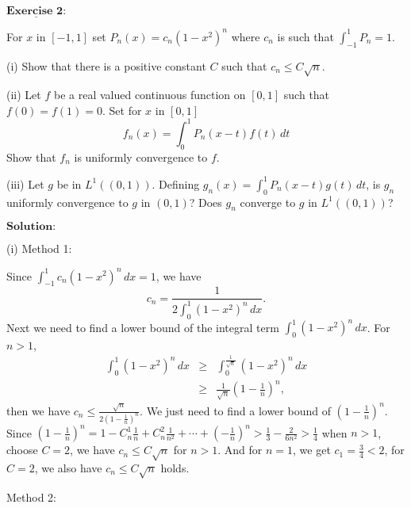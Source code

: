 \documentclass[12pt,a4paper]{ctexart}
\begin{document}
$\underline{\textbf{Exercise 2:}}$

For $x$ in $[-1, 1]$ set $P_{n} (x) = c_{n} (1 - x^{2})^{n}$ where $c_{n}$ is such that $\int_{-1}^{1} P_{n} = 1.$

(i) Show that there is a positive constant $C$ such that $c_{n} \leq C \sqrt{n}$.

(ii) Let $f$ be a real valued continuous function on $[0, 1]$ such that $f(0) = f(1) = 0$. Set for $x$ in $[0, 1]$
\begin{equation*}
    f_{n}(x) = \int_{0}^{1} P_{n}(x-t) f(t) \, d t
\end{equation*}
Show that $f_{n}$ is uniformly convergence to $f$.

(iii) Let $g$ be in $L^{1}((0, 1))$. Defining $g_{n}(x) = \int_{0}^{1} P_{n} (x- t) g(t) \, d t$, is $g_{n}$ uniformly convergence to $g$ in $(0, 1)$? Does $g_{n}$ converge to $g$ in $L^{1}((0, 1))$?

\vspace{8pt}
$\textbf{Solution:}$

(i) Method 1:

Since $\int_{-1}^{1} c_{n} (1-x^{2})^{n}\, d x = 1$, we have
\begin{equation*}
   c_{n} = \frac{1}{2 \int_{0}^{1}(1-x^{2})^{n} \, d x }.
\end{equation*}
Next we need to find a lower bound of the integral term $\int_{0}^{1}(1-x^{2})^{n} \, d x$. For $n > 1$,
\begin{eqnarray*}
\int_{0}^{1}(1-x^{2})^{n} \, d x &\geq& \int_{0}^{\frac{1}{\sqrt{n}}}(1-x^{2})^{n} \, d x  \\
            &\geq& \frac{1}{\sqrt{n}} (1 - \frac{1}{n})^{n},
\end{eqnarray*}
then we have $c_{n} \leq \frac{\sqrt{n}}{2 (1-\frac{1}{n})^{n}}$. We just need to find a lower bound of $(1 - \frac{1}{n})^{n}$. Since $(1 - \frac{1}{n})^{n} = 1 - C_{n}^{1} \frac{1}{n} + C_{n}^{2} \frac{1}{n^{2}} + \cdots + (-\frac{1}{n})^{n} > \frac{1}{3} - \frac{2}{6n^{2}}  > \frac{1}{4}$ when $n > 1$, choose $C = 2$, we have $c_{n} \leq C \sqrt{n}$ for $n>1$. And for $n = 1$, we get $c_{1} = \frac{3}{4} < 2$, for $C = 2$, we also have $c_{n} \leq C \sqrt{n}$ holds.

Method 2:
\end{document}
